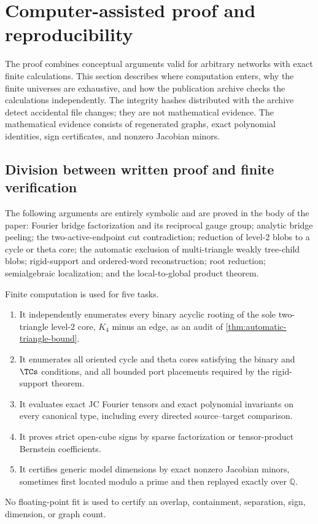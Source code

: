 \section{Computer-assisted proof and reproducibility}\label{sec:computation}

The proof combines conceptual arguments valid for arbitrary networks with exact finite calculations.  This section describes where computation enters, why the finite universes are exhaustive, and how the publication archive checks the calculations independently.  The integrity hashes distributed with the archive detect accidental file changes; they are not mathematical evidence.  The mathematical evidence consists of regenerated graphs, exact polynomial identities, sign certificates, and nonzero Jacobian minors.

\subsection{Division between written proof and finite verification}

The following arguments are entirely symbolic and are proved in the body of the paper: Fourier bridge factorization and its reciprocal gauge group; analytic bridge peeling; the two-active-endpoint cut contradiction; reduction of level-2 blobs to a cycle or theta core; the automatic exclusion of multi-triangle weakly tree-child blobs; rigid-support and ordered-word reconstruction; root reduction; semialgebraic localization; and the local-to-global product theorem.

Finite computation is used for five tasks.
\begin{enumerate}[label=\textup{(\roman*)}]
\item It independently enumerates every binary acyclic rooting of the sole two-triangle level-2 core, $K_4$ minus an edge, as an audit of \cref{thm:automatic-triangle-bound}.
\item It enumerates all oriented cycle and theta cores satisfying the binary and $\TCs$ conditions, and all bounded port placements required by the rigid-support theorem.
\item It evaluates exact JC Fourier tensors and exact polynomial invariants on every canonical type, including every directed source--target comparison.
\item It proves strict open-cube signs by sparse factorization or tensor-product Bernstein coefficients.
\item It certifies generic model dimensions by exact nonzero Jacobian minors, sometimes first located modulo a prime and then replayed exactly over $\mathbb Q$.
\end{enumerate}
No floating-point fit is used to certify an overlap, containment, separation, sign, dimension, or graph count.

